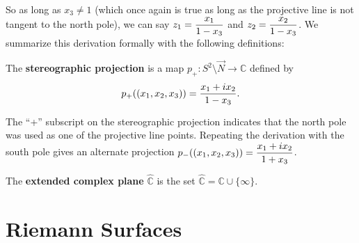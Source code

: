 So as long as $x_3\neq 1$ (which once again is true as long as the projective line is not tangent to the north pole), we can say $z_1=\dfrac{{x_1}}{{1-x_3}}$ and $z_2=\dfrac{{x_2}}{{1-x_3}}$. We summarize this derivation formally with the following definitions:

\begin{definition}[]
    The \textbf{\textcolor{myblue}{stereographic projection}} is a map $p_+:S^2\setminus\vec{N}\to \mathbb{C}$ defined by \begin{equation}p_+((x_1,x_2,x_3))=\dfrac{{x_1+ix_2}}{{1-x_3}}.\end{equation}
\end{definition}
The ``+'' subscript on the stereographic projection indicates that the north pole was used as one of the projective line points. Repeating the derivation with the south pole gives an alternate projection $p_-((x_1,x_2,x_3))=\dfrac{{x_1+ix_2}}{{1+x_3}}$. 

\begin{definition}The \textbf{\textcolor{myblue}{extended complex plane}} $\widehat{\mathbb{C}}$ is the set $\widehat{\mathbb{C}}=\mathbb{C}\cup\{\infty\}$.
\end{definition}


\section{Riemann Surfaces}
